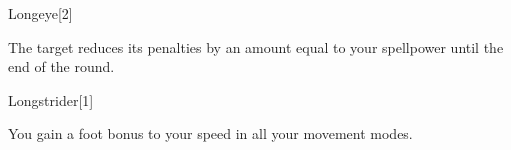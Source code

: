 \begin{spellsection}{Longeye}[2]
    \begin{spellheader}
    \end{spellheader}
    \begin{spellcontent}
        \begin{spelltargetinginfo}
        \end{spelltargetinginfo}
        \begin{spelleffects}
            \spelleffect The target reduces its  penalties by an amount equal to your spellpower until the end of the round.
        \end{spelleffects}
    \end{spellcontent}
    \begin{spellfooter}
        \miscastexplode
    \end{spellfooter}
    \begin{spellaugments}
    \end{spellaugments}
\end{spellsection}

\begin{spellsection}{Longstrider}[1]
    \begin{spellheader}
    \end{spellheader}
    \begin{spellcontent}
        \begin{spelltargetinginfo}
        \end{spelltargetinginfo}
        \begin{spelleffects}
            \spelleffect You gain a  foot bonus to your speed in all your movement modes.
            \spelldur \durlong \dismissable
        \end{spelleffects}
    \end{spellcontent}
    \begin{spellfooter}
        \miscastexplode
    \end{spellfooter}
    \begin{spellaugments}
    \end{spellaugments}
\end{spellsection}

